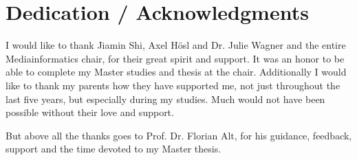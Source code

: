 
\section*{Dedication / Acknowledgments}


I would like to thank Jiamin Shi, Axel H{\"o}sl and Dr. Julie Wagner and the entire Mediainformatics chair, for their great spirit and support. It was an honor to be able to complete my Master studies and thesis at the chair. Additionally I would like to thank my parents how they have supported me, not just throughout the last five years, but especially during my studies. Much would not have been possible without their love and support. 

But above all the thanks goes to Prof. Dr. Florian Alt, for his guidance, feedback, support and the time devoted to my Master thesis.
